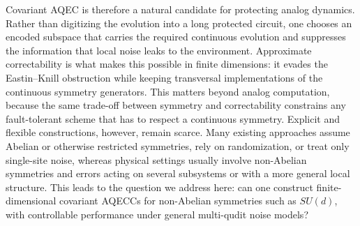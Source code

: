 \documentclass[10pt,twocolumn,superscriptaddress,aps,amsmath,amssymb,citeautoscript,floatfix,prx]{revtex4-2}
\theoremstyle{plain}
\theoremstyle{plain}
\theoremstyle{plain}
\theoremstyle{plain}
\theoremstyle{plain}
\theoremstyle{plain}
\theoremstyle{plain}
\theoremstyle{definition}
\theoremstyle{plain}
\begin{document}
Covariant AQEC is therefore a natural candidate for protecting analog dynamics. Rather than digitizing the evolution into a long protected circuit, one chooses an encoded subspace 
that carries the required continuous evolution and suppresses the information that local noise leaks to the environment. 
Approximate correctability is what makes this possible in finite dimensions: it evades the Eastin--Knill obstruction while keeping transversal 
implementations of the continuous symmetry generators. This matters beyond analog computation, because the same trade-off between symmetry and correctability constrains any fault-tolerant scheme that has to respect a continuous symmetry. 
Explicit and flexible constructions, however, remain scarce. Many existing approaches assume Abelian or otherwise restricted symmetries, rely on randomization, or treat only single-site noise, whereas physical settings usually involve non-Abelian 
symmetries and errors acting on several subsystems or with a more general local structure. This leads to the question we address here: can one construct finite-dimensional covariant AQECCs for non-Abelian symmetries such as $SU(d)$, with controllable performance under general multi-qudit noise models?
\end{document}
